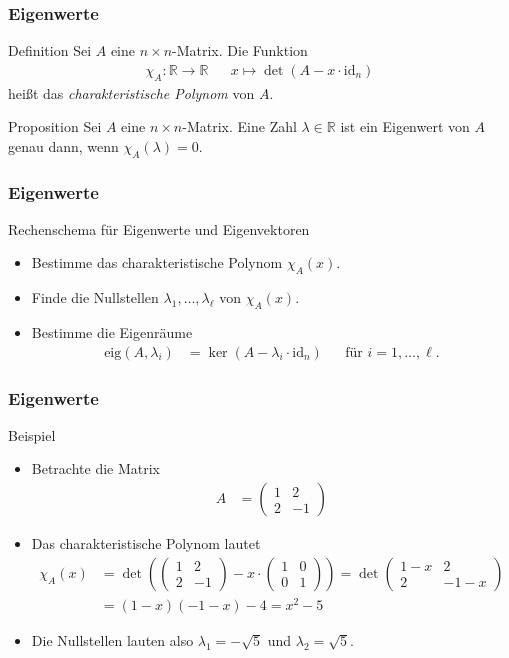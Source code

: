 \documentclass{beamer}
\renewcommand{\emph}[1]{{\textcolor{solarizedRed}{\itshape #1}}}
\newcommand\RR{\mathbb R}
\newcommand{\id}{\mathrm{id}}
\newcommand\bc[1]{\left({#1}\right)}
\renewcommand{\ae}{\"a}
\newcommand{\ue}{\"u}
\newcommand{\eig}{\mathrm{eig}}
\newcommand{\mytitle}{Eigenwerte}
\begin{document}
\begin{frame}\frametitle{\mytitle}
	\begin{block}{Definition}
		Sei $A$ eine $n\times n$-Matrix.
		Die Funktion
		\begin{align*}
			\chi_A:\RR\to\RR&&x\mapsto\det(A-x\cdot\id_n)
		\end{align*}
		hei\ss t das \emph{charakteristische Polynom} von $A$.
	\end{block}
\begin{block}{Proposition}
		Sei $A$ eine $n\times n$-Matrix.
		Eine Zahl $\lambda\in\RR$ ist ein Eigenwert von $A$ genau dann, wenn $\chi_A(\lambda)=0$.
	\end{block}
\end{frame}

\begin{frame}\frametitle{\mytitle}
	\begin{block}{Rechenschema f\ue r Eigenwerte und Eigenvektoren}
	\begin{itemize}
		\item Bestimme das charakteristische Polynom $\chi_A(x)$.
		\item Finde die Nullstellen $\lambda_1,\ldots,\lambda_\ell$ von $\chi_A(x)$.
		\item Bestimme die Eigenr\ae ume
			\begin{align*}
				\eig(A,\lambda_i)&=\ker(A-\lambda_i\cdot\id_n)&&\mbox{f\ue r }i=1,\ldots,\ell.
			\end{align*}
	\end{itemize}
	\end{block}
\end{frame}

\begin{frame}\frametitle{\mytitle}
	\begin{block}{Beispiel}
	\begin{itemize}
	\item Betrachte die Matrix
		\begin{align*}
			A&=\begin{pmatrix}1&2\\2&-1\end{pmatrix}
		\end{align*}
	\item Das charakteristische Polynom lautet
		\begin{align*}
			\chi_A(x)&=\det\bc{ \begin{pmatrix}1&2\\2&-1\end{pmatrix}-x\cdot\begin{pmatrix}1&0\\0&1\end{pmatrix} }
									 =\det\begin{pmatrix} 1-x&2\\2&-1-x \end{pmatrix}\\
															 &=(1-x)(-1-x)-4=x^2-5
		\end{align*}
	\item Die Nullstellen lauten also $\lambda_1=-\sqrt 5$ und $\lambda_2=\sqrt 5$.
	\end{itemize}
	\end{block}
\end{frame}
\end{document}
